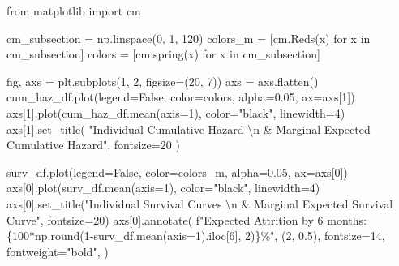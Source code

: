 \documentclass[
  letterpaper,
  DIV=11,
  numbers=noendperiod]{scrartcl}
\newenvironment{Shaded}{\begin{snugshade}}{\end{snugshade}}
\newcommand{\BuiltInTok}[1]{\textcolor[rgb]{0.00,0.23,0.31}{#1}}
\newcommand{\CharTok}[1]{\textcolor[rgb]{0.13,0.47,0.30}{#1}}
\newcommand{\ControlFlowTok}[1]{\textcolor[rgb]{0.00,0.23,0.31}{#1}}
\newcommand{\DecValTok}[1]{\textcolor[rgb]{0.68,0.00,0.00}{#1}}
\newcommand{\FloatTok}[1]{\textcolor[rgb]{0.68,0.00,0.00}{#1}}
\newcommand{\ImportTok}[1]{\textcolor[rgb]{0.00,0.46,0.62}{#1}}
\newcommand{\KeywordTok}[1]{\textcolor[rgb]{0.00,0.23,0.31}{#1}}
\newcommand{\NormalTok}[1]{\textcolor[rgb]{0.00,0.23,0.31}{#1}}
\newcommand{\OperatorTok}[1]{\textcolor[rgb]{0.37,0.37,0.37}{#1}}
\newcommand{\SpecialCharTok}[1]{\textcolor[rgb]{0.37,0.37,0.37}{#1}}
\newcommand{\SpecialStringTok}[1]{\textcolor[rgb]{0.13,0.47,0.30}{#1}}
\newcommand{\StringTok}[1]{\textcolor[rgb]{0.13,0.47,0.30}{#1}}
\newcommand{\VariableTok}[1]{\textcolor[rgb]{0.07,0.07,0.07}{#1}}
\begin{document}
\begin{Shaded}
\begin{Highlighting}[]
\ImportTok{from}\NormalTok{ matplotlib }\ImportTok{import}\NormalTok{ cm}

\NormalTok{cm\_subsection }\OperatorTok{=}\NormalTok{ np.linspace(}\DecValTok{0}\NormalTok{, }\DecValTok{1}\NormalTok{, }\DecValTok{120}\NormalTok{)}
\NormalTok{colors\_m }\OperatorTok{=}\NormalTok{ [cm.Reds(x) }\ControlFlowTok{for}\NormalTok{ x }\KeywordTok{in}\NormalTok{ cm\_subsection]}
\NormalTok{colors }\OperatorTok{=}\NormalTok{ [cm.spring(x) }\ControlFlowTok{for}\NormalTok{ x }\KeywordTok{in}\NormalTok{ cm\_subsection]}


\NormalTok{fig, axs }\OperatorTok{=}\NormalTok{ plt.subplots(}\DecValTok{1}\NormalTok{, }\DecValTok{2}\NormalTok{, figsize}\OperatorTok{=}\NormalTok{(}\DecValTok{20}\NormalTok{, }\DecValTok{7}\NormalTok{))}
\NormalTok{axs }\OperatorTok{=}\NormalTok{ axs.flatten()}
\NormalTok{cum\_haz\_df.plot(legend}\OperatorTok{=}\VariableTok{False}\NormalTok{, color}\OperatorTok{=}\NormalTok{colors, alpha}\OperatorTok{=}\FloatTok{0.05}\NormalTok{, ax}\OperatorTok{=}\NormalTok{axs[}\DecValTok{1}\NormalTok{])}
\NormalTok{axs[}\DecValTok{1}\NormalTok{].plot(cum\_haz\_df.mean(axis}\OperatorTok{=}\DecValTok{1}\NormalTok{), color}\OperatorTok{=}\StringTok{"black"}\NormalTok{, linewidth}\OperatorTok{=}\DecValTok{4}\NormalTok{)}
\NormalTok{axs[}\DecValTok{1}\NormalTok{].set\_title(}
    \StringTok{"Individual Cumulative Hazard }\CharTok{\textbackslash{}n}\StringTok{ \& Marginal Expected Cumulative Hazard"}\NormalTok{, fontsize}\OperatorTok{=}\DecValTok{20}
\NormalTok{)}

\NormalTok{surv\_df.plot(legend}\OperatorTok{=}\VariableTok{False}\NormalTok{, color}\OperatorTok{=}\NormalTok{colors\_m, alpha}\OperatorTok{=}\FloatTok{0.05}\NormalTok{, ax}\OperatorTok{=}\NormalTok{axs[}\DecValTok{0}\NormalTok{])}
\NormalTok{axs[}\DecValTok{0}\NormalTok{].plot(surv\_df.mean(axis}\OperatorTok{=}\DecValTok{1}\NormalTok{), color}\OperatorTok{=}\StringTok{"black"}\NormalTok{, linewidth}\OperatorTok{=}\DecValTok{4}\NormalTok{)}
\NormalTok{axs[}\DecValTok{0}\NormalTok{].set\_title(}\StringTok{"Individual Survival Curves }\CharTok{\textbackslash{}n}\StringTok{  \& Marginal Expected Survival Curve"}\NormalTok{, fontsize}\OperatorTok{=}\DecValTok{20}\NormalTok{)}
\NormalTok{axs[}\DecValTok{0}\NormalTok{].annotate(}
    \SpecialStringTok{f"Expected Attrition by 6 months: }\SpecialCharTok{\{}\DecValTok{100}\OperatorTok{*}\NormalTok{np}\SpecialCharTok{.}\BuiltInTok{round}\NormalTok{(}\DecValTok{1}\OperatorTok{{-}}\NormalTok{surv\_df.mean(axis}\OperatorTok{=}\DecValTok{1}\NormalTok{).iloc[}\DecValTok{6}\NormalTok{], }\DecValTok{2}\NormalTok{)}\SpecialCharTok{\}}\SpecialStringTok{\%"}\NormalTok{,}
\NormalTok{    (}\DecValTok{2}\NormalTok{, }\FloatTok{0.5}\NormalTok{),}
\NormalTok{    fontsize}\OperatorTok{=}\DecValTok{14}\NormalTok{,}
\NormalTok{    fontweight}\OperatorTok{=}\StringTok{"bold"}\NormalTok{,}
\NormalTok{)}
\end{Highlighting}
\end{Shaded}
\end{document}
